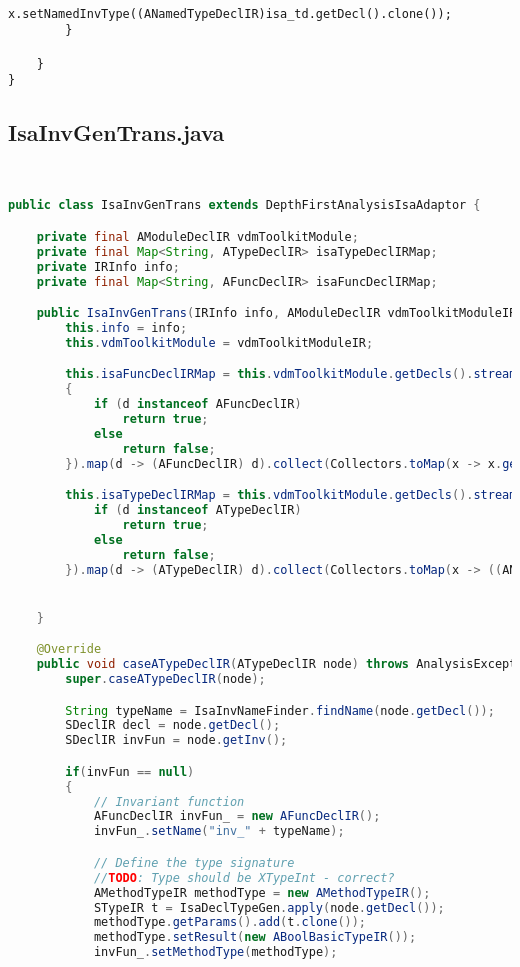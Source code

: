 \begin{appendices}
\begin{lstlisting}
            x.setNamedInvType((ANamedTypeDeclIR)isa_td.getDecl().clone());
        }

    }
}
\end{lstlisting}
\subsection{IsaInvGenTrans.java} \label{IsaInvGenTransbefore}
\begin{lstlisting}[language=Java]


public class IsaInvGenTrans extends DepthFirstAnalysisIsaAdaptor {

    private final AModuleDeclIR vdmToolkitModule;
    private final Map<String, ATypeDeclIR> isaTypeDeclIRMap;
    private IRInfo info;
    private final Map<String, AFuncDeclIR> isaFuncDeclIRMap;

    public IsaInvGenTrans(IRInfo info, AModuleDeclIR vdmToolkitModuleIR) {
        this.info = info;
        this.vdmToolkitModule = vdmToolkitModuleIR;

        this.isaFuncDeclIRMap = this.vdmToolkitModule.getDecls().stream().filter(d ->
        {
            if (d instanceof AFuncDeclIR)
                return true;
            else
                return false;
        }).map(d -> (AFuncDeclIR) d).collect(Collectors.toMap(x -> x.getName(), x -> x));

        this.isaTypeDeclIRMap = this.vdmToolkitModule.getDecls().stream().filter(d -> {
            if (d instanceof ATypeDeclIR)
                return true;
            else
                return false;
        }).map(d -> (ATypeDeclIR) d).collect(Collectors.toMap(x -> ((ANamedTypeDeclIR) x.getDecl()).getName().getName(), x -> x));


    }

    @Override
    public void caseATypeDeclIR(ATypeDeclIR node) throws AnalysisException {
        super.caseATypeDeclIR(node);

        String typeName = IsaInvNameFinder.findName(node.getDecl());
        SDeclIR decl = node.getDecl();
        SDeclIR invFun = node.getInv();

        if(invFun == null)
        {
            // Invariant function
            AFuncDeclIR invFun_ = new AFuncDeclIR();
            invFun_.setName("inv_" + typeName);

            // Define the type signature
            //TODO: Type should be XTypeInt - correct?
            AMethodTypeIR methodType = new AMethodTypeIR();
            STypeIR t = IsaDeclTypeGen.apply(node.getDecl());
            methodType.getParams().add(t.clone());
            methodType.setResult(new ABoolBasicTypeIR());
            invFun_.setMethodType(methodType);


\end{lstlisting}
\end{appendices}
